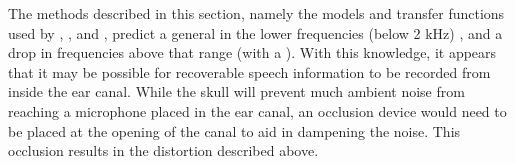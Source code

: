 




The methods described in this section, namely the models and transfer functions used by \cite{hansen:97b}, \cite{stenfelt:07}, and \cite{reinfeldt:10}, predict a general \DIFdelbegin {}\DIFdelend \DIFaddbegin {}\DIFaddend in the lower frequencies (below 2 kHz) \DIFaddbegin {}\DIFaddend , and a drop in frequencies above that range (with a \DIFdelbegin {}\DIFdelend \DIFaddbegin {}\DIFaddend ).  With this knowledge, it appears that it may be possible for recoverable speech information to be recorded from inside the ear canal.  While the skull will prevent much ambient noise from reaching a microphone placed in the ear canal, an occlusion device would need to be placed at the opening of the canal to aid in dampening the noise.  This occlusion results in the distortion described above.

